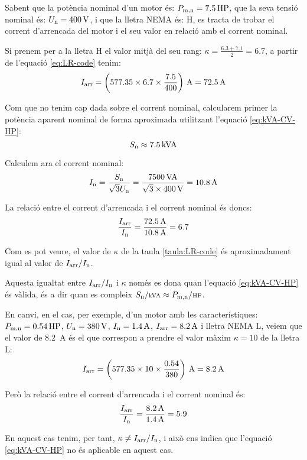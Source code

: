 	
\begin{exemple}[\MotorArrencNEMA{}]
	\addcontentsxms{\MotorArrencNEMA}
    Sabent que la  potència nominal d'un motor és: $P_\mathrm{m,n} = \qty{7,5}{HP}$,    que la seva tensió nominal és: $U_\mathrm{n}=\qty{400}{V}$, i que la lletra NEMA és: H, es tracta de trobar el corrent d'arrencada  del  motor i el seu valor en relació amb el corrent nominal.

    Si prenem per a la lletra H el valor mitjà del seu rang: $\kappa = \frac{\num{6,3}+\num{7,1}}{2}=\num{6,7}$, a partir de l'equació  \eqref{eq:LR-code} tenim:
    \[
      I\ped{arr} = \left(\num{577,35} \times \num{6,7} \times \frac{\num{7,5}}{400}\right) \,\unit{A} = \qty{72,5}{A}
    \]

    Com que no tenim cap dada sobre el corrent nominal, calcularem primer la potència aparent nominal de forma aproximada utilitzant l'equació \eqref{eq:kVA-CV-HP}:
    \[
        S_\mathrm{n} \approx \qty{7,5}{kVA}
    \]

    Calculem ara el corrent nominal:
    \[
        I_\mathrm{n}= \frac{S_\mathrm{n}}{\sqrt{3} U_\mathrm{n}} = \frac{\qty{7500}{VA}}{\sqrt{3}\times\qty{400}{V}} = \qty{10,8}{A}
    \]

    La relació entre el corrent d'arrencada i el corrent nominal és doncs:
    \[
        \frac{I_\mathrm{arr}}{I_\mathrm{n}} = \frac{\qty{72,5}{A}}{\qty{10,8}{A}} = \num{6,7}
    \]

    Com es pot veure, el valor  de $\kappa$ de la taula \vref{taula:LR-code} és aproximadament igual al valor de $I_\mathrm{arr}/I_\mathrm{n}$.

    Aquesta igualtat entre $I_\mathrm{arr}/I_\mathrm{n}$ i $\kappa$ només es dona quan l'equació \eqref{eq:kVA-CV-HP} és vàlida, és a dir quan es compleix $S\ped{n}/{\scriptstyle \unit{kVA}} \approx  P\ped{m,n}/{\scriptstyle \unit{HP}}$.

    En canvi, en el cas, per exemple, d'un motor amb les característiques: $P_\mathrm{m,n} = \qty{0,54}{HP}$, $U_\mathrm{n} = \qty{380}{V}$, $I_\mathrm{n} = \qty{1,4}{A}$, $I_\mathrm{arr} = \qty{8,2}{A}$ i lletra NEMA L, veiem que el valor de \qty{8,2}{A} és el que correspon a prendre  el valor màxim $\kappa = 10$ de la lletra L:
    \[
      I\ped{arr} = \left(\num{577,35} \times 10 \times \frac{\num{0,54}}{380}\right) \,\unit{A} = \qty{8,2}{A}
    \]

    Però la relació entre el corrent d'arrencada i el corrent nominal és:
    \[
        \frac{I_\mathrm{arr}}{I_\mathrm{n}} = \frac{\qty{8,2}{A}}{\qty{1,4}{A}} = \num{5,9}
    \]

    En aquest cas tenim, per tant, $\kappa \neq I_\mathrm{arr}/I_\mathrm{n}$, i això ens indica que l'equació \eqref{eq:kVA-CV-HP} no és aplicable en aquest cas.
\end{exemple}

